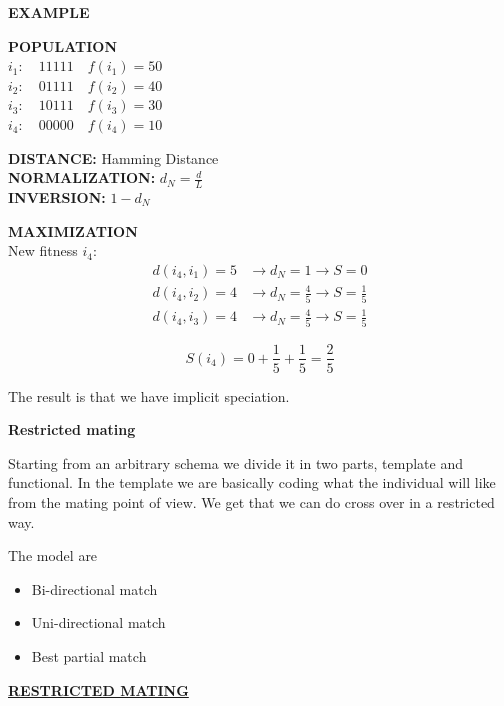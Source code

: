 \begin{center}
    \textbf{EXAMPLE}
\end{center}

\textbf{POPULATION} \\
$i_1: \quad 11111 \quad f(i_1) = 50$ \\
$i_2: \quad 01111 \quad f(i_2) = 40$ \\
$i_3: \quad 10111 \quad f(i_3) = 30$ \\
$i_4: \quad 00000 \quad f(i_4) = 10$

\vspace{1em}
\textbf{DISTANCE:} Hamming Distance \\
\textbf{NORMALIZATION:} $d_N = \frac{d}{L}$ \\
\textbf{INVERSION:} $1 - d_N$

\vspace{1em}
\textbf{MAXIMIZATION} \\
New fitness $i_4$:
\begin{align*}
    d(i_4, i_1) = 5 &\longrightarrow d_N = 1 \longrightarrow S = 0 \\
    d(i_4, i_2) = 4 &\longrightarrow d_N = \frac{4}{5} \longrightarrow S = \frac{1}{5} \\
    d(i_4, i_3) = 4 &\longrightarrow d_N = \frac{4}{5} \longrightarrow S = \frac{1}{5}
\end{align*}

\[ S(i_4) = 0 + \frac{1}{5} + \frac{1}{5} = \frac{2}{5} \]

The result is that we have implicit speciation.



\vspace{10pt}
\textbf{Restricted mating}
\vspace{10pt}

Starting from an arbitrary schema we divide it in two parts, template and functional. In the template we are basically coding what the individual will like from the mating point of view. We get that we can do cross over in a restricted way. 

The model are
\begin{itemize}
    \item Bi-directional match
    \item Uni-directional match
    \item Best partial match
\end{itemize}

\begin{center}
    \underline{\large \textbf{RESTRICTED MATING}}
\end{center}

